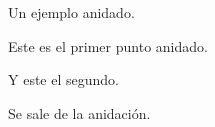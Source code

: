 \begin{nonfunctional}
        \item Un ejemplo anidado.
        \begin{nonfunctional}
                \item Este es el primer punto anidado.
                \item Y este el segundo.
        \end{nonfunctional}
        \item Se sale de la anidación.
\end{nonfunctional}